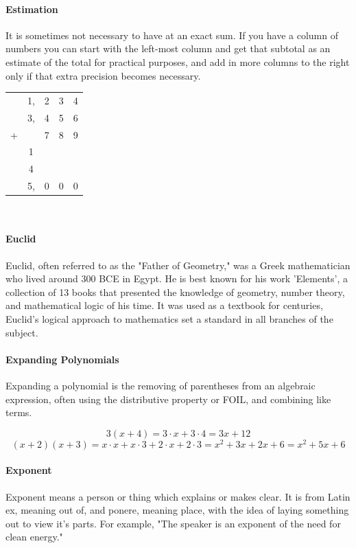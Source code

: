 \documentclass[12pt]{article}
\begin{document}
\paragraph{Estimation}
It is sometimes not necessary to have at an exact sum. If you have a column of numbers you can start with the left-most column and get that subtotal as an estimate of the total for practical purposes, and add in more columns to the right only if that extra precision becomes necessary.

\begin{center}
\begin{tabular}{c@{\,}c@{\,}c@{\,}c@{\,}c}
	&1,&2&3&4\\
	&3,&4&5&6\\
	+ & &7&8&9\\
	\hline
	& 1& &&\\
	& 4& & &\\
	\hline
	&5,&0&0&0\\
	\hline
	\hline
\end{tabular}\\
\end{center}

\paragraph{Euclid}
Euclid, often referred to as the "Father of Geometry," was a Greek mathematician who lived around 300 BCE in Egypt. He is best known for his work 'Elements', a collection of 13 books that presented the knowledge of geometry, number theory, and mathematical logic of his time. It was used as a textbook for centuries, Euclid's logical approach to mathematics set a standard in all branches of the subject.

\paragraph{Expanding Polynomials}
Expanding a polynomial is the removing of parentheses from an algebraic expression, often using the distributive property or FOIL, and combining like terms. 

\[3(x + 4) = 3 \cdot x + 3 \cdot 4 = 3x + 12\]
\[(x + 2)(x + 3) = x \cdot x + x \cdot 3 + 2 \cdot x + 2 \cdot 3 = x^2 + 3x + 2x + 6 = x^2 + 5x + 6\]

\paragraph{Exponent}
Exponent means a person or thing which explains or makes clear. It is from Latin ex, meaning out of, and ponere, meaning place, with the idea of laying something out to view it's parts. For example, "The speaker is an exponent of the need for clean energy."
\end{document}
